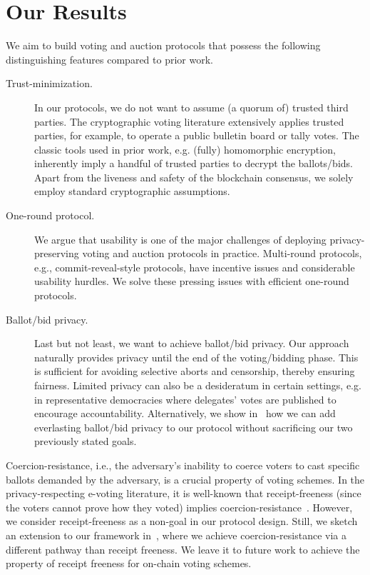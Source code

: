 \section{Our Results}
We aim to build voting and auction protocols that possess the following distinguishing features compared to prior work.
\begin{description}
    \item[Trust-minimization.] In our protocols, we do not want to assume (a quorum of) trusted third parties. The cryptographic voting literature extensively applies trusted parties, for example, to operate a public bulletin board or tally votes. The classic tools used in prior work, e.g. (fully) homomorphic encryption, inherently imply a handful of trusted parties to decrypt the ballots/bids. Apart from the liveness and safety of the blockchain consensus, we solely employ standard cryptographic assumptions.

    \item[One-round protocol.] We argue that usability is one of the major challenges of deploying privacy-preserving voting and auction protocols in practice. Multi-round protocols, e.g., commit-reveal-style protocols, have incentive issues and considerable usability hurdles. We solve these pressing issues with efficient one-round protocols.  

    \item[Ballot/bid privacy.] Last but not least, we want to achieve ballot/bid privacy. Our approach naturally provides privacy until the end of the voting/bidding phase. This is sufficient for avoiding selective aborts and censorship, thereby ensuring fairness. Limited privacy can also be a desideratum in certain settings, e.g. in representative democracies where delegates' votes are published to encourage accountability.
    Alternatively, we show in~ how we can add everlasting ballot/bid privacy to our protocol without sacrificing our two previously stated goals. 
\end{description}

Coercion-resistance, i.e., the adversary's inability to coerce voters to cast specific ballots demanded by the adversary, is a crucial property of voting schemes. In the privacy-respecting e-voting literature, it is well-known that receipt-freeness (since the voters cannot prove how they voted) implies coercion-resistance~\cite{STOC:BenTui94}. However, we consider receipt-freeness as a non-goal in our protocol design. Still, we sketch an extension to our framework in~, where we achieve coercion-resistance via a different pathway than receipt freeness. We leave it to future work to achieve the property of receipt freeness for on-chain voting schemes.%

